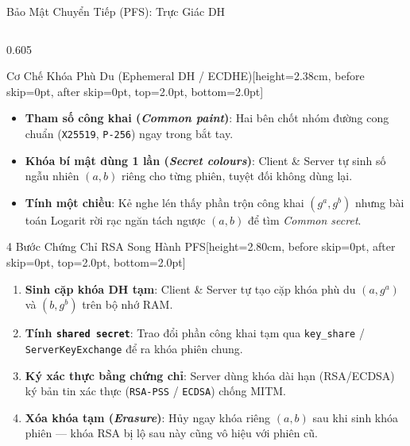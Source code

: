 \documentclass[aspectratio=169, 10pt]{beamer}
\begin{document}
\begin{frame}{Bảo Mật Chuyển Tiếp (PFS): Trực Giác DH}
\begin{columns}[T]
		\begin{column}{0.605\textwidth}
			\begin{accentcard}[uetblue]{Cơ Chế Khóa Phù Du (Ephemeral DH / ECDHE)}[height=2.38cm, before skip=0pt, after skip=0pt, top=2.0pt, bottom=2.0pt]
				\raggedright
				\setlength{\leftmargini}{10pt}
				\begin{itemize}\setlength{\itemsep}{0.6pt}\setlength{\topsep}{0pt}\fontsize{6.0pt}{7.25pt}\selectfont
					\item \textbf{Tham số công khai (\textit{Common paint})}: Hai bên chốt nhóm đường cong chuẩn (\texttt{X25519}, \texttt{P-256}) ngay trong bắt tay.
					\item \textbf{Khóa bí mật dùng 1 lần (\textit{Secret colours})}: Client \& Server tự sinh số ngẫu nhiên $(a, b)$ riêng cho từng phiên, tuyệt đối không dùng lại.
					\item \textbf{Tính một chiều}: Kẻ nghe lén thấy phần trộn công khai $(g^a, g^b)$ nhưng bài toán Logarit rời rạc ngăn tách ngược $(a, b)$ để tìm \textit{Common secret}.
				\end{itemize}
			\end{accentcard}\par\nointerlineskip\vspace{0.08cm}\noindent
			\begin{accentcard}[uetblue]{4 Bước Chứng Chỉ RSA Song Hành PFS}[height=2.80cm, before skip=0pt, after skip=0pt, top=2.0pt, bottom=2.0pt]
				\raggedright
				\setlength{\leftmargini}{12pt}
				\begin{enumerate}\setlength{\itemsep}{0.8pt}\setlength{\topsep}{0pt}\fontsize{6.0pt}{7.25pt}\selectfont
					\item \textbf{Sinh cặp khóa DH tạm}: Client \& Server tự tạo cặp khóa phù du $(a, g^a)$ và $(b, g^b)$ trên bộ nhớ RAM.
					\item \textbf{Tính \texttt{shared secret}}: Trao đổi phần công khai tạm qua \texttt{key\_share} / \texttt{ServerKeyExchange} để ra khóa phiên chung.
					\item \textbf{Ký xác thực bằng chứng chỉ}: Server dùng khóa dài hạn (RSA/ECDSA) ký bản tin xác thực (\texttt{RSA-PSS} / \texttt{ECDSA}) chống MITM.
					\item \textbf{Xóa khóa tạm (\textit{Erasure})}: Hủy ngay khóa riêng $(a, b)$ sau khi sinh khóa phiên --- khóa RSA bị lộ sau này cũng vô hiệu với phiên cũ.
				\end{enumerate}
			\end{accentcard}
		\end{column}
	\end{columns}
\end{frame}
\end{document}
